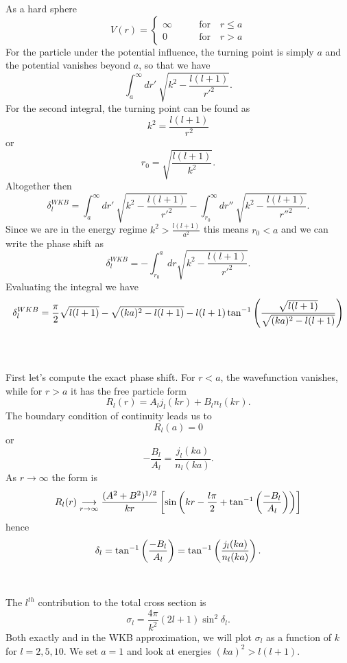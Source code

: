\documentclass[10pt,letterpaper]{article}
\begin{document}
	\benum
	\item
 	As a hard sphere
	\[
		V(r) = \begin{cases} \infty &\qquad \text{for}\quad r\le a\\
						0 &\qquad \text{for}\quad r>a 
						\end{cases}
	\]
	For the particle under the potential influence, the turning point is simply $a$ and the potential vanishes
	beyond $a$, so that we have
	\[
		\int_{a}^{\infty} dr'\ \sqrt{k^2-\frac{l(l+1)}{r'^2}} .
	\]
	For the second integral, the turning point can be found as
	\[
		k^2 = \frac{l(l+1)}{r^2}
	\]
	or 
	\[
		r_0 = \sqrt{\frac{l(l+1)}{k^2}}.
	\]
	Altogether then
	\[
		\delta_l^{WKB}= \int_{a}^{\infty} dr'\ \sqrt{k^2-\frac{l(l+1)}{r'^2}}
		- \int_{r_0}^{\infty} dr''\ \sqrt{k^2-\frac{l(l+1)}{r''^2}}.
	\]
	Since we are in the energy regime $k^2 >\frac{l(l+1)}{a^2}$ this means $r_0 < a$ and we can write 
	the phase shift as
	\[
		\delta_l^{WKB} = -\int_{r_0}^a dr \sqrt{k^2-\frac{l(l+1)}{r'^2}} .
	\]
	Evaluating the integral we have
	\[
		\delta_l^{WKB} = \frac{\pi}{2}\sqrt{l(l+1)}-\sqrt{(ka)^2-l(l+1)}-l(l+1)
		\tan^{-1}\left(\frac{\sqrt{l(l+1)}}{\sqrt{(ka)^2-l(l+1)}}\right)
	\]
	\\
	\\
	
	\item
	First let's compute the exact phase shift. For $r<a$, the wavefunction vanishes, while for $r>a$ it has the
	free particle form
	\[
		R_l(r) = A_lj_l(kr) + B_ln_l(kr).
	\]
	The boundary condition of continuity leads us to
	\[
		R_l(a) = 0
	\]
	or
	\[
		-\frac{B_l}{A_l} = \frac{j_l(ka)}{n_l(ka)}.
	\]
	As $r\to\infty$ the form is
	\[
		R_l(r)  \underset{r\to\infty}\longrightarrow \frac{(A^2+B^2)^{1/2}}{kr}
		\left[\sin\left(kr-\frac{l\pi}{2}+\tan^{-1}\left(\frac{-B_l}{A_l}\right)\right)\right]
	\]
	hence
	\[
		\delta_l = \tan^{-1}\left(\frac{-B_l}{A_l}\right) = \tan^{-1}\left(\frac{j_l(ka)}{n_l(ka)}\right).
	\]
	\\
	\\
	The $l^{th}$ contribution to the total cross section is
	\[
		\sigma_l = \frac{4\pi}{k^2}(2l+1)\sin^2\delta_l.
	\]
	Both exactly and in the WKB approximation, we will plot $\sigma_l$ as a function of $k$ 
	for $l=2,5,10$. We set $a=1$ and look at energies $(ka)^2>l(l+1)$.
	
\end{document}
